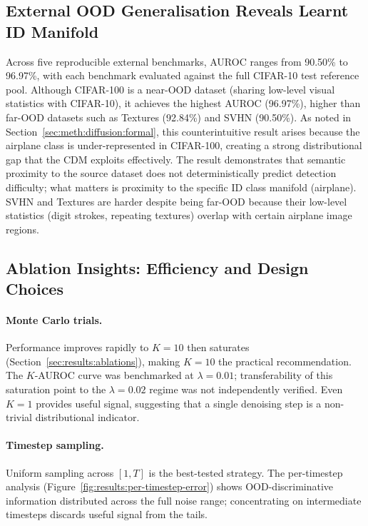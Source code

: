 \subsection{External OOD Generalisation Reveals Learnt ID Manifold}
\label{sec:disc:cifar:external}

Across five reproducible external benchmarks, AUROC ranges from 90.50\% to
96.97\%, with each benchmark evaluated against the full CIFAR-10 test
reference pool. Although CIFAR-100 is a near-OOD dataset (sharing low-level
visual statistics with CIFAR-10), it achieves the highest AUROC
(96.97\%), higher than far-OOD datasets such as Textures (92.84\%) and
SVHN (90.50\%). As noted in
Section~\ref{sec:meth:diffusion:formal},
this counterintuitive result arises because the airplane class is
under-represented in CIFAR-100, creating a strong distributional gap
that the CDM exploits effectively. The result demonstrates that semantic
proximity to the source dataset does not deterministically predict
detection difficulty; what matters is proximity to the specific ID class
manifold (airplane). SVHN and Textures are harder despite being far-OOD
because their low-level statistics (digit strokes, repeating textures)
overlap with certain airplane image regions.

\subsection{Ablation Insights: Efficiency and Design Choices}
\label{sec:disc:cifar:ablation}

\paragraph{Monte Carlo trials.}
Performance improves rapidly to $K{=}10$ then saturates
(Section~\ref{sec:results:ablations}),
making $K{=}10$ the practical recommendation. The $K$-AUROC curve was
benchmarked at $\lambda{=}0.01$; transferability of this saturation
point to the $\lambda{=}0.02$ regime was not independently verified.
Even $K{=}1$ provides useful signal, suggesting that a single denoising
step is a non-trivial distributional indicator.

\paragraph{Timestep sampling.}
Uniform sampling across $[1, T]$ is the best-tested strategy. The per-timestep analysis
(Figure~\ref{fig:results:per-timestep-error}) shows OOD-discriminative
information distributed across the full noise range; concentrating on
intermediate timesteps discards useful signal from the tails.

